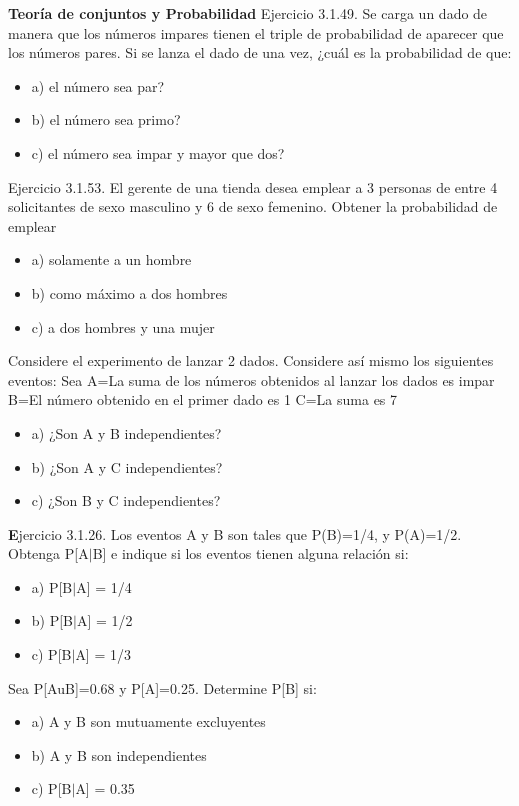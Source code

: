 \documentclass{oxmathproblems}
\begin{document}
\begin{questions}

\miquestion \textbf{Teoría de conjuntos y Probabilidad} Ejercicio 3.1.49. Se carga un dado de manera que los números impares tienen el triple de probabilidad de aparecer que  los números pares. Si se lanza el dado de una vez, ¿cuál es la probabilidad de que: 
\begin{itemize}
\item  a) el número sea par?
\item  b) el número sea primo?
\item  c) el número sea impar y mayor que dos?
\end{itemize}

\miquestion Ejercicio 3.1.53. El gerente de una tienda desea emplear a 3 personas de entre 4 solicitantes de sexo masculino y 6 de sexo femenino. Obtener la probabilidad de emplear 
\begin{itemize}
\item  a) solamente a un hombre
\item  b) como máximo a dos hombres
\item  c) a dos hombres y una  mujer
\end{itemize}

\miquestion Considere el experimento de lanzar 2 dados. Considere así mismo los siguientes eventos: Sea 
A={La suma de los números obtenidos al lanzar los dados es impar}
B={El número obtenido en el primer dado es 1}
C={La suma es 7}
\begin{itemize}
 \item a) ¿Son A y B independientes?
\item b) ¿Son A y C independientes?
\item c) ¿Son B y C independientes?
\end{itemize}
\miquestion \textbf 
Ejercicio 3.1.26. Los eventos A y B son tales que P(B)=1/4, y P(A)=1/2. Obtenga P[A$\mid$B] e indique si los eventos tienen alguna relación si: 
\begin{itemize}
 \item a) P[B$\mid$A] = 1/4
 \item b) P[B$\mid$A] = 1/2
 \item  c) P[B$\mid$A] = 1/3
\end{itemize}

\miquestion Sea P[AuB]=0.68 y P[A]=0.25. Determine P[B] si:
\begin{itemize}
 \item a) A y B son mutuamente excluyentes 
 \item b) A y B son independientes
 \item  c) P[B$\mid$A] = 0.35 
\end{itemize}


\end{questions}
\end{document}
